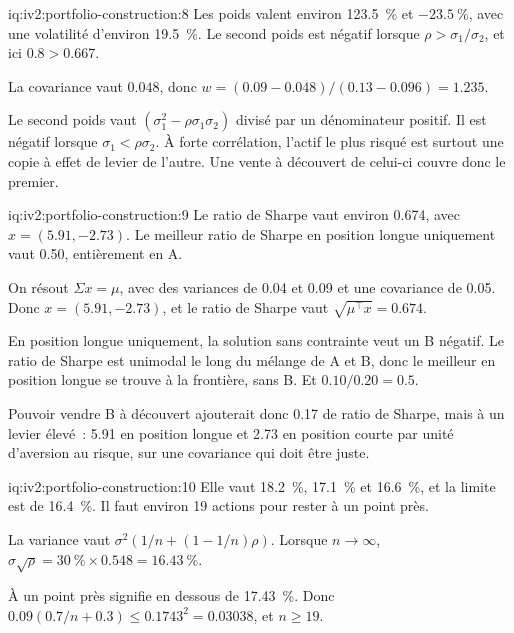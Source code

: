 \begin{solution}{iq:iv2:portfolio-construction:8}
Les poids valent environ 123.5~\% et $-23.5~\%$, avec une volatilité d'environ 19.5~\%. Le second poids est négatif lorsque $\rho > \sigma_1/\sigma_2$, et ici $0.8 > 0.667$.

La covariance vaut $0.048$, donc $w = (0.09 - 0.048)/(0.13 - 0.096) = 1.235$.

Le second poids vaut $(\sigma_1^2 - \rho\sigma_1\sigma_2)$ divisé par un dénominateur positif. Il est négatif lorsque $\sigma_1 < \rho\sigma_2$. À forte corrélation, l'actif le plus risqué est surtout une copie à effet de levier de l'autre. Une vente à découvert de celui-ci couvre donc le premier.

\end{solution}

\begin{solution}{iq:iv2:portfolio-construction:9}
Le ratio de Sharpe vaut environ 0.674, avec $x = (5.91, -2.73)$. Le meilleur ratio de Sharpe en position longue uniquement vaut 0.50, entièrement en A.

On résout $\Sigma x = \mu$, avec des variances de 0.04 et 0.09 et une covariance de 0.05. Donc $x = (5.91, -2.73)$, et le ratio de Sharpe vaut $\sqrt{\mu^\top x} = 0.674$.

En position longue uniquement, la solution sans contrainte veut un B négatif. Le ratio de Sharpe est unimodal le long du mélange de A et B, donc le meilleur en position longue se trouve à la frontière, sans B. Et $0.10/0.20 = 0.5$.

Pouvoir vendre B à découvert ajouterait donc 0.17 de ratio de Sharpe, mais à un levier élevé~: 5.91 en position longue et 2.73 en position courte par unité d'aversion au risque, sur une covariance qui doit être juste.

\end{solution}

\begin{solution}{iq:iv2:portfolio-construction:10}
Elle vaut 18.2~\%, 17.1~\% et 16.6~\%, et la limite est de 16.4~\%. Il faut environ 19 actions pour rester à un point près.

La variance vaut $\sigma^2(1/n + (1 - 1/n)\rho)$. Lorsque $n \to \infty$, $\sigma\sqrt{\rho} = 30~\% \times 0.548 = 16.43~\%$.

À un point près signifie en dessous de 17.43~\%. Donc $0.09(0.7/n + 0.3) \le 0.1743^2 = 0.03038$, et $n \ge 19$.

\end{solution}

